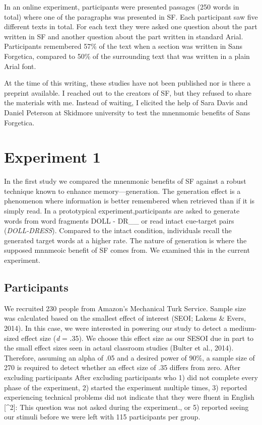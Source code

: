 \documentclass[doc]{apa6}
\begin{document}
In an online experiment, participants were presented passages (250 words in total) where one of the paragraphs was presented in SF. Each participant saw five different texts in total. For each text they were asked one question about the part written in SF and another question about the part written in standard Arial. Participants remembered 57\% of the text when a section was written in Sans Forgetica, compared to 50\% of the surrounding text that was written in a plain Arial font.

At the time of this writing, these studies have not been published nor is there a preprint available. I reached out to the creators of SF, but they refused to share the materials with me. Instead of waiting, I elicited the help of Sara Davis and Daniel Peterson at Skidmore university to test the mnenmomic benefits of Sans Forgetica.

\hypertarget{experiment-1}{%
\section{Experiment 1}\label{experiment-1}}

In the first study we compared the mnenmonic benefits of SF against a robust technique known to enhance memory---generation. The generation effect is a phenomenon where information is better remembered when retrieved than if it is simply read. In a prototypical experiment,participants are asked to generate words from word fragments DOLL - DR\_\_ or read intact cue-target pairs (\emph{DOLL-DRESS}). Compared to the intact condition, individuals recall the generated target words at a higher rate. The nature of generation is where the supposed mnnmeoic benefit of SF comes from. We examined this in the current experiment.

\hypertarget{participants}{%
\subsection{Participants}\label{participants}}

We recruited 230 people from Amazon's Mechanical Turk Service. Sample size was calculated based on the smallest effect of interest (SEOI; Lakens \& Evers, 2014). In this case, we were interested in powering our study to detect a medium-sized effect size (\emph{d} = .35). We choose this effect size as our SESOI due in part to the small effect sizes seen in actaul classroom studies (Bulter et al., 2014). Therefore, assuming an alpha of .05 and a desired power of 90\%, a sample size of 270 is required to detect whether an effect size of .35 differs from zero. After excluding participants After excluding participants who 1) did not complete every phase of the experiment, 2) started the experiment multiple times, 3) reported experiencing technical problems did not indicate that they were fluent in English {[}\^{}2{]}: This question was not asked during the experiment., or 5) reported seeing our stimuli before we were left with 115 participants per group.
\end{document}
